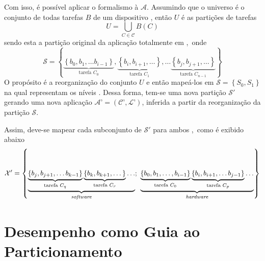         Com isso, é possível aplicar o formalismo à $ \mathcal{A} $.
        Assumindo que o universo é o conjunto de todas tarefas $B$ de um dispositivo \wearable, então $U$ é as partições de tarefas
        \begin{equation}
            U = \bigcup_{C \in \mathcal{C}} B(C) \label{eq:bigcup}
        \end{equation}
        sendo esta a partição original da aplicação totalmente em \software,\ onde
        \begin{equation}
            \mathcal{S}  = \left \{
            \underbrace{\left \{ b_0, b_1, \dots b_{i-1} \right \}}_{\text{tarefa }C_0},
            \underbrace{\left \{ b_i, b_{i+1}, \dots \right \}}_{\text{tarefa }C_1},\dots
            \underbrace{\left \{ b_j, b_{j+1}, \dots \right \}}_{\text{tarefa }C_{n-1}}
            \right \}
        \end{equation}
        O propósito é a reorganização do conjunto $ U $ e então mapeá-los em $ \mathcal{S} = \left\{S_0, S_1\right\} $ na qual representam os níveis \hs.
        Dessa forma, tem-se uma nova partição $ \mathcal{S}' $ gerando uma nova aplicação $ \mathcal{A}’ = (\mathcal{C}’, \mathcal{L}’) $, inferida a partir da reorganização da partição $ \mathcal{S} $.
        
        Assim, deve-se mapear cada subconjunto de $ \mathcal{S}' $ para ambos \hs,\ como é exibido abaixo
        \begin{equation}
            \mathcal{X}'   = \left \{
            \underbrace{
               \underbrace{
                  \left \{ b_j, b_{j+1}, \dots b_{k-1} \right \}
               }_{\text{tarefa }C_q}
               \underbrace{
                  \left \{ b_k, b_{k+1}, \dots \right \}
               }_{\text{tarefa }C_r}
               \dots
            }_{\text{\textit{software}}};
            \
            \underbrace{
               \underbrace{
                  \left \{ b_0, b_1, \dots, b_{i-1} \right \}
               }_{\text{tarefa }C_0}
               \underbrace{
                  \left \{ b_i, b_{i+1}, \dots b_{j-1} \right \}
               }_{\text{tarefa }C_p}
               \dots
            }_{\text{\textit{hardware}}}
            \right \} \label{eq:part_final}
        \end{equation}


    \section{Desempenho como Guia ao Particionamento} \label{sec:ganho_desempenho}
